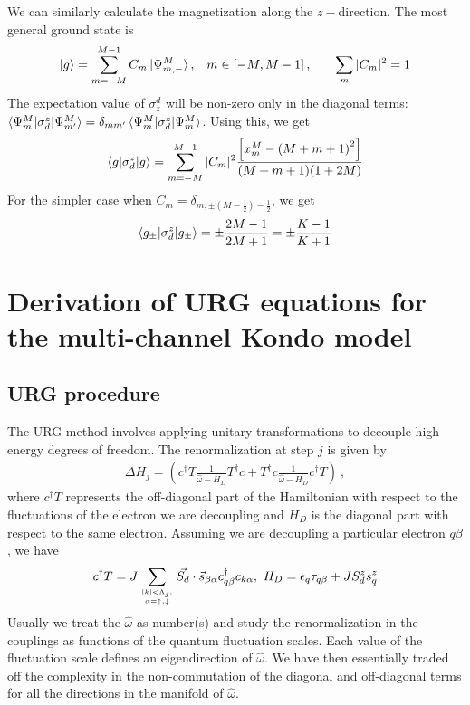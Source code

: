 \documentclass{revtex4-2}
\begin{document}
We can similarly calculate the magnetization along the \(z-\)direction. The most general ground state is
\begin{align}
	\ket{g} = \sum_{m=-M}^{M-1} C_m \ket{\Psi^M_{m,-}}, &&& m \in \left[-M, M-1\right], &&& \sum_m |C_m|^2 = 1
\end{align}
The expectation value of \(\sigma^d_z\) will be non-zero only in the diagonal terms: \(\braket{\Psi^M_m | \sigma^z_d | \Psi^M_{m^\prime}} = \delta_{mm^\prime}\braket{\Psi^M_m | \sigma^z_d | \Psi^M_{m}}\). Using this, we get
\begin{align}
	\braket{g|\sigma^z_d|g} = \sum_{m=-M}^{M-1} |C_m|^2 \frac{\left[x_m^M - \left(M + m + 1\right)^2\right]}{{(M+m+1)(1+2M)}}
\end{align}
For the simpler case when \(C_m = \delta_{m,\pm (M - \frac{1}{2}) - \frac{1}{2}}\), we get
\begin{align}
	\braket{g_\pm|\sigma^z_d|g_\pm} = \pm \frac{2M-1}{2M+1} = \pm \frac{K-1}{K+1}
\end{align}

\section{Derivation of URG equations for the multi-channel Kondo model}

\subsection{URG procedure}
The URG method \cite{anirbanurg1,anirbanurg2,anirbanmott1,anirbanmott2,siddharthacpi,santanukagome} involves applying unitary transformations to decouple high energy degrees of freedom. The renormalization at step \(j\) is given by
\begin{align}
	\Delta H_j = \left(c^\dagger T \frac{1}{\hat \omega - H_D}T^\dagger c + T^\dagger c \frac{1}{\hat \omega - H_D}c^\dagger T\right)~,
\end{align}
where \(c^\dagger T\) represents the off-diagonal part of the Hamiltonian with respect to the fluctuations of the electron we are decoupling and \(H_D\) is the diagonal part with respect to the same electron. Assuming we are decoupling a particular electron \(q\beta\), we have
\begin{align}
	c^\dagger T = J \sum_{|k| < \Lambda_j, \atop{\alpha=\uparrow,\downarrow}}\vec{S_d}\cdot\vec{s}_{\beta \alpha}c^\dagger_{q\beta}c_{k\alpha}, ~H_D = \epsilon_q \tau_{q\beta} + J S_d^z s_q^z
\end{align}
Usually we treat the \(\hat \omega\) as number(s) and study the renormalization in the couplings as functions of the quantum fluctuation scales. Each value of the fluctuation scale defines an eigendirection of \(\hat \omega\). We have then essentially traded off the complexity in the non-commutation of the diagonal and off-diagonal terms for all the directions in the manifold of \(\hat \omega\).
\end{document}
